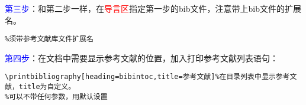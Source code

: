 \documentclass[cn,hazy,blue,14pt,geye,normal,]{elegantnote}
\begin{document}
\textcolor{blue}{第三步}：和第二步一样，在\textcolor{red}{导言区}指定第一步的bib文件，注意带上bib文件的扩展名。
\begin{example}
	\label{example:02}
\begin{lstlisting}
%须带参考文献库文件扩展名
\end{lstlisting}\par
\end{example}
\textcolor{blue}{第四步}：在文档中需要显示参考文献的位置，加入打印参考文献列表语句：
\begin{example}
\begin{lstlisting}
\printbibliography[heading=bibintoc,title=参考文献]%在目录列表中显示参考文献，title为自定义。
%可以不带任何参数，用默认设置

\end{lstlisting}
\end{example}
\end{document}

